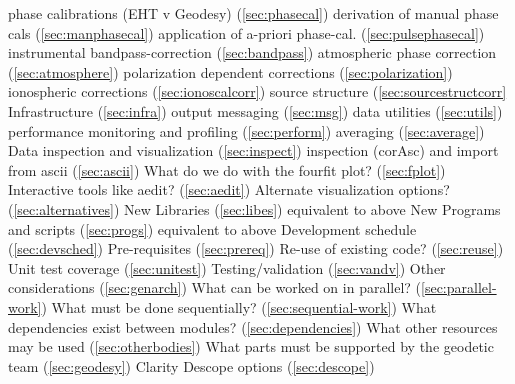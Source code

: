 \begin{outline}[enumerate]
    \3 phase calibrations (EHT v Geodesy) (\ref{sec:phasecal})
    \3 derivation of manual phase cals (\ref{sec:manphasecal})
    \3 application of a-priori phase-cal. (\ref{sec:pulsephasecal})
    \3 instrumental bandpass-correction (\ref{sec:bandpass})
    \3 atmospheric phase correction (\ref{sec:atmosphere})
    \3 polarization dependent corrections (\ref{sec:polarization})
    \3 ionospheric corrections (\ref{sec:ionoscalcorr})
    \3 source structure (\ref{sec:sourcestructcorr}
  \2 Infrastructure (\ref{sec:infra})
    \3 output messaging (\ref{sec:msg})
    \3 data utilities (\ref{sec:utils})
    \3 performance monitoring and profiling (\ref{sec:perform})
    \3 averaging (\ref{sec:average})
  \2 Data inspection and visualization (\ref{sec:inspect})
    \3 inspection (corAsc) and import from ascii (\ref{sec:ascii})
    \3 What do we do with the fourfit plot? (\ref{sec:fplot})
    \3 Interactive tools like aedit? (\ref{sec:aedit})
    \3 Alternate visualization options? (\ref{sec:alternatives})
  \2 New Libraries (\ref{sec:libes})
    \3 equivalent to above
  \2 New Programs and scripts (\ref{sec:progs})
    \3 equivalent to above
\1 Development schedule (\ref{sec:devsched})
  \2 Pre-requisites (\ref{sec:prereq})
  \2 Re-use of existing code? (\ref{sec:reuse})
  \2 Unit test coverage (\ref{sec:unitest})
  \2 Testing/validation (\ref{sec:vandv})
  \2 Other considerations (\ref{sec:genarch})
    \3 What can be worked on in parallel? (\ref{sec:parallel-work})
    \3 What must be done sequentially? (\ref{sec:sequential-work})
    \3 What dependencies exist between modules? (\ref{sec:dependencies})
    \3 What other resources may be used (\ref{sec:otherbodies})
    \3 What parts must be supported by the geodetic team (\ref{sec:geodesy})
    \3 Clarity Descope options (\ref{sec:descope})
\end{outline}





